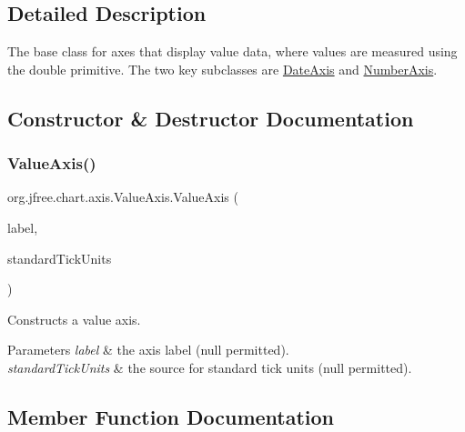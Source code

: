 \subsection{Detailed Description}
The base class for axes that display value data, where values are measured using the {\ttfamily double} primitive. The two key subclasses are \mbox{\hyperlink{classorg_1_1jfree_1_1chart_1_1axis_1_1_date_axis}{Date\+Axis}} and \mbox{\hyperlink{classorg_1_1jfree_1_1chart_1_1axis_1_1_number_axis}{Number\+Axis}}. 

\subsection{Constructor \& Destructor Documentation}
\mbox{\label{classorg_1_1jfree_1_1chart_1_1axis_1_1_value_axis_a86472a48304fb1bcaaaaeb288049d0df}} 
\subsubsection{\texorpdfstring{Value\+Axis()}{ValueAxis()}}
{\footnotesize\ttfamily org.\+jfree.\+chart.\+axis.\+Value\+Axis.\+Value\+Axis (\begin{DoxyParamCaption}\item[{String}]{label,  }\item[{\mbox{\hyperlink{interfaceorg_1_1jfree_1_1chart_1_1axis_1_1_tick_unit_source}{Tick\+Unit\+Source}}}]{standard\+Tick\+Units }\end{DoxyParamCaption})\hspace{0.3cm}{\ttfamily [protected]}}

Constructs a value axis.


\begin{DoxyParams}{Parameters}
{\em label} & the axis label ({\ttfamily null} permitted). \\
\hline
{\em standard\+Tick\+Units} & the source for standard tick units ({\ttfamily null} permitted). \\
\hline
\end{DoxyParams}


\subsection{Member Function Documentation}
\mbox{\label{classorg_1_1jfree_1_1chart_1_1axis_1_1_value_axis_a7db5e263b4b1a191c146e577974374f1}} 

